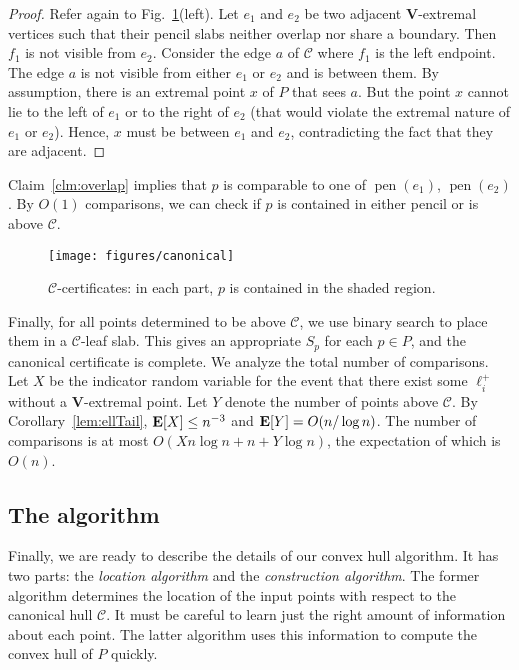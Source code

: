 \documentclass[letterpaper,11pt]{article}
\newcommand{\EX}{\hbox{\bf E}}
\DeclareMathOperator{\pen}{pen}
\newcommand{\cC}{\mathcal{C}}
\begin{document}
\begin{proof} 
Refer again to 
Fig.~\ref{fig:canonical}(left). 
Let $e_1$ and $e_2$ be two adjacent 
$\textbf{V}$-extremal vertices 
such that their pencil slabs neither 
overlap nor share a boundary. Then 
$f_1$ is not visible from $e_2$. 
Consider the edge $a$ of $\cC$ 
where $f_1$ is the left endpoint. 
The edge $a$ is not visible from 
either $e_1$ or $e_2$ and is 
between them. By assumption, 
there is an extremal point 
$x$ of $P$ that sees $a$. But 
the point $x$ cannot lie to the 
left of $e_1$ or to the right 
of $e_2$ (that would violate the 
extremal nature of $e_1$ or $e_2$). 
Hence, $x$ must be between $e_1$ and 
$e_2$, contradicting the fact that 
they are adjacent.
\end{proof}

Claim~\ref{clm:overlap} implies that
$p$ is comparable to one of 
$\pen(e_1)$, $\pen(e_2)$.
By $O(1)$ comparisons, we can check 
if $p$ is contained in either 
pencil or is above $\cC$.
\begin{figure}
  \centering
  \texttt{[image: figures/canonical]}
  \caption{$\cC$-certificates: in each part, 
   $p$ is contained in the shaded region.}
  \label{fig:canonical}
\end{figure}
Finally, for all points determined 
to be above $\cC$, we use binary search
to place them in a $\cC$-leaf slab. This 
gives an appropriate $S_p$ for each 
$p \in P$, and the canonical certificate 
is complete.
We analyze the total number of comparisons.
Let $X$ be the indicator random variable 
for the event that there exist some 
$\ell^+_i$ without a $\textbf{V}$-extremal 
point. Let $Y$ denote the number of 
points above $\cC$. By 
Corollary~\ref{lem:ellTail}, $\EX[X] \leq n^{-3}$
and $\EX[Y] = O(n/\log n)$. 
The number of comparisons is at most 
$O(Xn\log n + n + Y\log n)$,
the expectation of which is $O(n)$.

\subsection{The algorithm}

Finally, we are ready to 
describe the details of our convex 
hull algorithm. It has two parts: 
the \emph{location algorithm} and the 
\emph{construction algorithm}. The 
former algorithm determines the location 
of the input points with respect to the 
canonical hull $\cC$. It must be careful 
to learn just the right amount of information 
about each point. The latter algorithm uses 
this information to compute the convex
hull of $P$ quickly.
\end{document}
